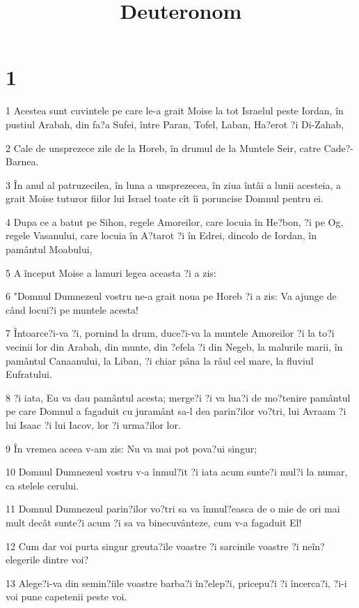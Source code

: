 

\title{Deuteronom}


\chapter{1}

\par 1 Acestea sunt cuvintele pe care le-a grait Moise la tot Israelul peste Iordan, în pustiul Arabah, din fa?a Sufei, între Paran, Tofel, Laban, Ha?erot ?i Di-Zahab,
\par 2 Cale de unsprezece zile de la Horeb, în drumul de la Muntele Seir, catre Cade?-Barnea.
\par 3 În anul al patruzecilea, în luna a unsprezecea, în ziua întâi a lunii acesteia, a grait Moise tuturor fiilor lui Israel toate cît îi poruncise Domnul pentru ei.
\par 4 Dupa ce a batut pe Sihon, regele Amoreilor, care locuia în He?bon, ?i pe Og, regele Vasanului, care locuia în A?tarot ?i în Edrei, dincolo de Iordan, în pamântul Moabului,
\par 5 A început Moise a lamuri legea aceasta ?i a zis:
\par 6 "Domnul Dumnezeul vostru ne-a grait noua pe Horeb ?i a zis: Va ajunge de când locui?i pe muntele acesta!
\par 7 Întoarce?i-va ?i, pornind la drum, duce?i-va la muntele Amoreilor ?i la to?i vecinii lor din Arabah, din munte, din ?efela ?i din Negeb, la malurile marii, în pamântul Canaanului, la Liban, ?i chiar pâna la râul cel mare, la fluviul Eufratului.
\par 8 ?i iata, Eu va dau pamântul acesta; merge?i ?i va lua?i de mo?tenire pamântul pe care Domnul a fagaduit cu juramânt sa-l dea parin?ilor vo?tri, lui Avraam ?i lui Isaac ?i lui Iacov, lor ?i urma?ilor lor.
\par 9 În vremea aceea v-am zis: Nu va mai pot pova?ui singur;
\par 10 Domnul Dumnezeul vostru v-a înmul?it ?i iata acum sunte?i mul?i la numar, ca stelele cerului.
\par 11 Domnul Dumnezeul parin?ilor vo?tri sa va înmul?easca de o mie de ori mai mult decât sunte?i acum ?i sa va binecuvânteze, cum v-a fagaduit El!
\par 12 Cum dar voi purta singur greuta?ile voastre ?i sarcinile voastre ?i neîn?elegerile dintre voi?
\par 13 Alege?i-va din semin?iile voastre barba?i în?elep?i, pricepu?i ?i încerca?i, ?i-i voi pune capetenii peste voi.
